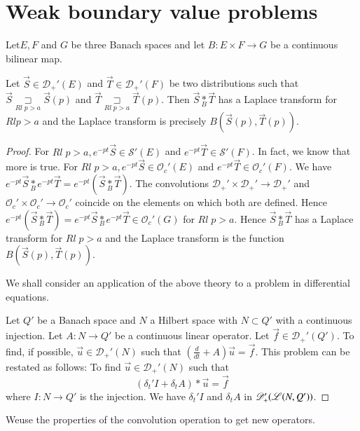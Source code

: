
\chapter{Weak boundary value problems}\label{chap16}

Let\pageoriginale $E, F$ and $G$ be three Banach spaces and let
$B:E\times F\to G$ be a continuous bilinear map.
\setcounter{section}{16}
\setcounter{prop}{0}
\begin{prop}\label{chap16:prop16.1}
Let $\overrightarrow{S} \in \mathscr{D}_+'(E)$ and $\overrightarrow{T}
\in \mathscr{D}_+'(F)$ be two distributions such that
$\overrightarrow{S} \underset{Rl\; p>a}{\sqsupset} \overrightarrow{S}
(p)$ and $\overrightarrow{T} \underset{Rl\; p>a}{\sqsupset}
\overrightarrow{T} (p)$. Then $\overrightarrow{S} \underset{B}{*}
\overrightarrow{T}$  has a Laplace transform for $Rl p>a$ and the
Laplace transform is precisely $B(\overrightarrow{S}(p),
\overrightarrow{T} (p))$. 
\end{prop}

\begin{proof}
For $Rl\; p > a, e^{-pt} \overrightarrow{S} \in \mathscr{S}'(E)$ and
$e^{-pt} \overrightarrow{T} \in \mathscr{S}'(F)$. In fact, we know
that more is true. For $Rl \; p>a, e^{-pt} \overrightarrow{S} \in
\mathscr{O}_c'(E)$ and $e^{-pt} \overrightarrow{T} \in
\mathscr{O}_c'(F)$. We have $e^{-pt} \overrightarrow{S}
\underset{B}{*} e^{-pt} \overrightarrow{T} =
e^{-pt}(\overrightarrow{S} \underset{B}{*} \overrightarrow{T})$. The
convolutions $\mathscr{D}_+' \times \mathscr{D}_+' \to \mathscr{D}_+'$
and $\mathscr{O}_c' \times \mathscr{O}_c' \to \mathscr{O}_c'$ coincide
on the elements on which both are defined. Hence $e^{-pt}
(\overrightarrow{S} \underset{B}{*} \overrightarrow{T})= e^{-pt}
\overrightarrow{S} \underset{B}{*} e^{-pt} \overrightarrow{T} \in
\mathscr{O}_c'(G)$ for $Rl \; p>a$. Hence $\overrightarrow{S}
\underset{B}{*} \overrightarrow{T}$ has a Laplace transform for $Rl \;
p>a$ and the Laplace transform is the function
$B(\overrightarrow{S}(p), \overrightarrow{T} (p))$. 

We shall consider an application of the above theory to a problem in
differential equations. 

Let $Q'$ be a Banach space and $N$ a Hilbert space with $N \subset Q'$
with a continuous injection. Let $A:N\to Q'$ be a continuous linear
operator. Let $\overrightarrow{f} \in \mathscr{D}_+'(Q')$. To find, if
possible, $\overrightarrow{u} \in \mathscr{D}_+'(N)$ such that
$(\frac{d}{dt} + A) \overrightarrow{u}= \overrightarrow{f}$. This
problem can be restated as follows: To find $\overrightarrow{u} \in
\mathscr{D}_+'(N)$ such that 
$$
(\delta_t' I + \delta_t A) * \overrightarrow{u} = \overrightarrow{f}
$$
where $I : N \to Q'$ is the injection. We have $\delta_t' I$ and
$\delta_t A$ in $\mathscr{D}_+'(\mathscr{L}(N,\break Q'))$.  
\end{proof}
\noindent We\pageoriginale use the properties of the convolution operation to
get new operators.

